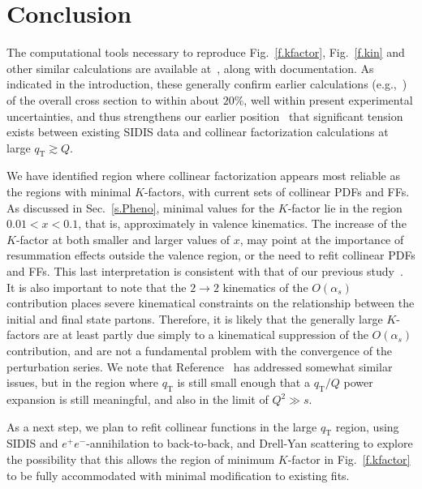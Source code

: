 \documentclass[prd,preprintnumbers,nofootinbib,superscriptaddress,onecolumn,preprint]{revtex4-1}
\newcommand\3[1]{\boldsymbol{#1}}
\newcommand{\Tsc}[2]{#1_{#2\text{T}}}
\newcommand{\parz}[1]{\ensuremath{\left(#1\right)}}
\newcommand{\order}[1]{\ensuremath{O\parz{#1}}}
\newcommand{\fref}[1]{Fig.~\ref{f.#1}}
\newcommand{\sref}[1]{Sec.~\ref{s.#1}}
\begin{document}
\section{Conclusion}
\label{s.conc}
The computational tools necessary to reproduce \fref{kfactor}, \fref{kin} and other similar 
calculations are available at~\cite{BigTMD}, along with documentation. As indicated in the 
introduction, these generally confirm earlier calculations 
(e.g.,~\cite{Daleo:2004pn,Kniehl:2004hf}) of the overall cross section to within about 
$20\%$, well within present experimental uncertainties, and thus strengthens our 
earlier position~\cite{Gonzalez-Hernandez:2018ipj} 
that significant tension exists between existing SIDIS data and collinear factorization 
calculations at large $\Tsc{q}{} \gtrsim Q$. 

We have identified region 
where collinear factorization appears most reliable as the 
regions with minimal $K$-factors, with current sets of collinear PDFs and FFs. As 
discussed in \sref{Pheno}, minimal values for the $K$-factor
lie in the region $0.01<x<0.1$, that is, approximately in valence kinematics. The increase 
of the $K$-factor at both smaller and larger values of $x$, may point at the importance of 
resummation effects outside the valence region, or the need to refit collinear 
PDFs and FFs. 
This last interpretation is consistent with that of our previous 
study~\cite{Gonzalez-Hernandez:2018ipj}. It is also important to note that the $2 \to 2$ 
kinematics of the $\order{\alpha_s}$ contribution places severe kinematical constraints 
on the relationship between the initial and final state partons. Therefore, it is likely that 
the generally large $K$-factors are at least partly due simply to a kinematical suppression 
of the $\order{\alpha_s}$ contribution, and are not a fundamental problem with the 
convergence of the perturbation series. We note that 
Reference~\cite{Balitsky:2017gis} has addressed somewhat similar issues, but in the 
region where $\Tsc{q}{}$ is still small enough that a $\Tsc{q}{}/Q$ power expansion 
is still meaningful, and also in the limit of $Q^2 \gg s$.

As a next step, we plan to refit collinear functions in the large $\Tsc{q}{}$ region, using 
SIDIS and $e^+ e^-$-annihilation to back-to-back, and Drell-Yan scattering to explore 
the possibility that this allows the region of minimum $K$-factor in \fref{kfactor} to be 
fully accommodated with minimal modification to existing fits. 
\end{document}
